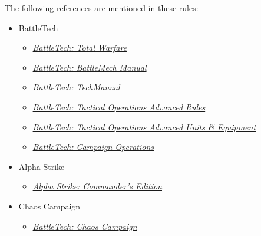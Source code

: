 The following references are mentioned in these rules:

\begin{itemize}

  \item BattleTech

  \begin{itemize}

    \item \emph{\href{https://store.catalystgamelabs.com/products/battletech-total-warfare-pdf}{BattleTech: Total Warfare}}

    \item \emph{\href{https://store.catalystgamelabs.com/products/battletech-battlemech-manual-book-pdf-combo}{BattleTech: BattleMech Manual}}

    \item \emph{\href{https://store.catalystgamelabs.com/products/battletech-techmanual-book-pdf}{BattleTech: TechManual}}

    \item \emph{\href{https://store.catalystgamelabs.com/products/battletech-tactical-operations-advanced-rules}{BattleTech: Tactical Operations Advanced Rules}}

    \item \emph{\href{https://store.catalystgamelabs.com/products/battletech-tactical-operations-advanced-units-equipement}{BattleTech: Tactical Operations Advanced Units \& Equipment}}

    \item \emph{\href{https://store.catalystgamelabs.com/products/battletech-campaign-operations-pdf}{BattleTech: Campaign Operations}}

  \end{itemize}

  \item Alpha Strike

  \begin{itemize}

    \item \emph{\href{https://store.catalystgamelabs.com/products/battletech-alpha-strike-commanders-edition}{Alpha Strike: Commander's Edition}}

  \end{itemize}

  \item Chaos Campaign

  \begin{itemize}

    \item \emph{\href{https://battletech.com/downloads/CAT35600_ChaosCampaign_Rulebook.pdf}{BattleTech: Chaos Campaign}}


\end{itemize}
\end{itemize}

